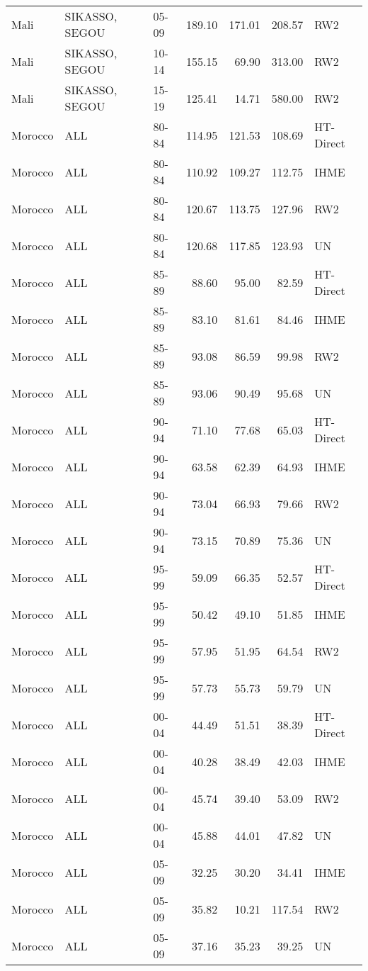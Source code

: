 \begin{longtable}{lllrrrl}
  Mali & SIKASSO, SEGOU & 05-09 & 189.10 & 171.01 & 208.57 & RW2 \\ 
  Mali & SIKASSO, SEGOU & 10-14 & 155.15 & 69.90 & 313.00 & RW2 \\ 
  Mali & SIKASSO, SEGOU & 15-19 & 125.41 & 14.71 & 580.00 & RW2 \\ 
  Morocco & ALL & 80-84 & 114.95 & 121.53 & 108.69 & HT-Direct \\ 
  Morocco & ALL & 80-84 & 110.92 & 109.27 & 112.75 & IHME \\ 
  Morocco & ALL & 80-84 & 120.67 & 113.75 & 127.96 & RW2 \\ 
  Morocco & ALL & 80-84 & 120.68 & 117.85 & 123.93 & UN \\ 
  Morocco & ALL & 85-89 & 88.60 & 95.00 & 82.59 & HT-Direct \\ 
  Morocco & ALL & 85-89 & 83.10 & 81.61 & 84.46 & IHME \\ 
  Morocco & ALL & 85-89 & 93.08 & 86.59 & 99.98 & RW2 \\ 
  Morocco & ALL & 85-89 & 93.06 & 90.49 & 95.68 & UN \\ 
  Morocco & ALL & 90-94 & 71.10 & 77.68 & 65.03 & HT-Direct \\ 
  Morocco & ALL & 90-94 & 63.58 & 62.39 & 64.93 & IHME \\ 
  Morocco & ALL & 90-94 & 73.04 & 66.93 & 79.66 & RW2 \\ 
  Morocco & ALL & 90-94 & 73.15 & 70.89 & 75.36 & UN \\ 
  Morocco & ALL & 95-99 & 59.09 & 66.35 & 52.57 & HT-Direct \\ 
  Morocco & ALL & 95-99 & 50.42 & 49.10 & 51.85 & IHME \\ 
  Morocco & ALL & 95-99 & 57.95 & 51.95 & 64.54 & RW2 \\ 
  Morocco & ALL & 95-99 & 57.73 & 55.73 & 59.79 & UN \\ 
  Morocco & ALL & 00-04 & 44.49 & 51.51 & 38.39 & HT-Direct \\ 
  Morocco & ALL & 00-04 & 40.28 & 38.49 & 42.03 & IHME \\ 
  Morocco & ALL & 00-04 & 45.74 & 39.40 & 53.09 & RW2 \\ 
  Morocco & ALL & 00-04 & 45.88 & 44.01 & 47.82 & UN \\ 
  Morocco & ALL & 05-09 & 32.25 & 30.20 & 34.41 & IHME \\ 
  Morocco & ALL & 05-09 & 35.82 & 10.21 & 117.54 & RW2 \\ 
  Morocco & ALL & 05-09 & 37.16 & 35.23 & 39.25 & UN \\ 

\end{longtable}
